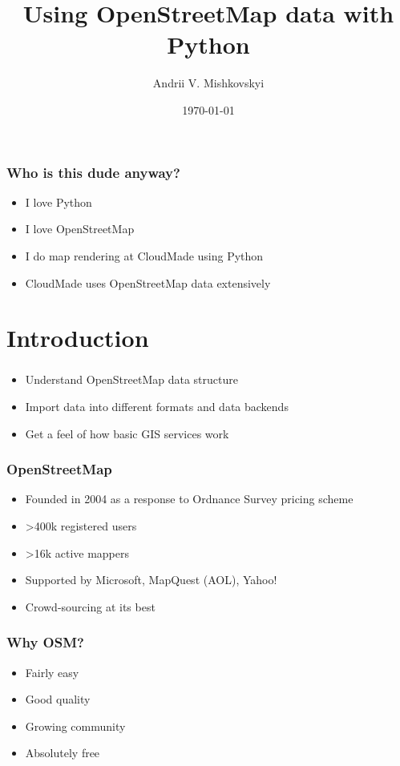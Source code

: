 \documentclass[14pt]{beamer}
\title{Using OpenStreetMap data with Python}
\author{Andrii V. Mishkovskyi}
\date{\today}
\begin{document}
\begin{frame}
  \titlepage
\end{frame}

\begin{frame}
  \frametitle{Who is this dude anyway?}
  \begin{itemize}
  \item I love Python
  \item I love OpenStreetMap
  \item I do map rendering at CloudMade using Python
  \item CloudMade uses OpenStreetMap data extensively
  \end{itemize}
\end{frame}

\section*{Introduction}

\begin{frame}
  \frametitle{}
  \begin{itemize}
  \item Understand OpenStreetMap data structure
  \item Import data into different formats and data backends
  \item Get a feel of how basic GIS services work
  \end{itemize}
\end{frame}

\begin{frame}
  \frametitle{OpenStreetMap}
  \begin{itemize}
  \item Founded in 2004 as a response to Ordnance
    Survey pricing scheme
  \item >400k registered users
  \item >16k active mappers
  \item Supported by Microsoft, MapQuest (AOL), Yahoo!
  \item Crowd-sourcing at its best
  \end{itemize}
\end{frame}

\begin{frame}
  \frametitle{Why OSM?}
  \begin{itemize}
  \item Fairly easy
  \item Good quality
  \item Growing community
  \item Absolutely free
  \end{itemize}
\end{frame}
\end{document}
